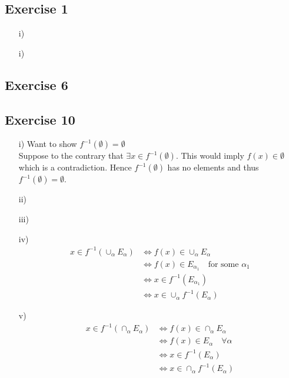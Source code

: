 \documentclass[a4paper, 12pt, twoside]{article}
\author{jdRanda}
\begin{document}
\subsection*{Exercise 1}
\begin{itemize}
    \item[i)]

    \item[i)]
\end{itemize}
\subsection*{Exercise 6}
\subsection*{Exercise 10}
\begin{itemize}
    \item[i)]Want to show $f^{-1}(\emptyset)=\emptyset$\\
    Suppose to the contrary that $\exists x\in f^{-1}(\emptyset)$. This would imply $f(x)\in\emptyset$ which is a contradiction. Hence $f^{-1}(\emptyset)$ has no elements and thus $f^{-1}(\emptyset)=\emptyset$.
    \item[ii)]
    \item[iii)]
    \item[iv)]
    \begin{align*}
            x\in f^{-1}(\cup_{\alpha}E_{\alpha}) &\iff f(x)\in\cup_{\alpha}E_{\alpha}\\
            &\iff f(x)\in E_{\alpha_{1}} \quad\text{for some } \alpha_{1}\\
            &\iff x\in f^{-1}(E_{\alpha_{1}})\\
            &\iff x\in\cup_{\alpha}f^{-1}(E_{\alpha})
    \end{align*}
    \item[v)]
    \begin{align*}
            x\in f^{-1}(\cap_{\alpha}E_{\alpha}) &\iff f(x)\in\cap_{\alpha}E_{\alpha}\\
            &\iff f(x)\in E_{\alpha} \quad\forall\alpha\\
            &\iff x\in f^{-1}(E_{\alpha})\\
            &\iff x\in\cap_{\alpha}f^{-1}(E_{\alpha})
    \end{align*}
\end{itemize}
\end{document}
